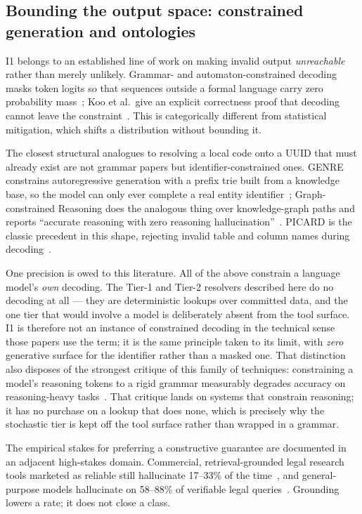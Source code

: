 \documentclass[11pt]{clapps}  %
\begin{document}
\subsection{Bounding the output space: constrained generation and ontologies}

I1 belongs to an established line of work on making invalid output
\emph{unreachable} rather than merely unlikely. Grammar- and
automaton-constrained decoding masks token logits so that sequences outside a
formal language carry zero probability
mass~\cite{willard2023outlines,geng2023gcd}; Koo et al.\ give an explicit
correctness proof that decoding cannot leave the
constraint~\cite{koo2024automata}. This is categorically different from
statistical mitigation, which shifts a distribution without bounding it.

The closest structural analogues to resolving a local code onto a UUID that must
already exist are not grammar papers but identifier-constrained ones. GENRE
constrains autoregressive generation with a prefix trie built from a knowledge
base, so the model can only ever complete a real entity
identifier~\cite{decao2021genre}; Graph-constrained Reasoning does the analogous
thing over knowledge-graph paths and reports ``accurate reasoning with zero
reasoning hallucination''~\cite{luo2024gcr}. PICARD is the classic precedent in
this shape, rejecting invalid table and column names during
decoding~\cite{scholak2021picard}.

One precision is owed to this literature. All of the above constrain a language
model's \emph{own} decoding. The Tier-1 and Tier-2 resolvers described here do
no decoding at all --- they are deterministic lookups over committed data, and
the one tier that would involve a model is deliberately absent from the tool
surface. I1 is therefore not an instance of constrained decoding in the
technical sense those papers use the term; it is the same principle taken to its
limit, with \emph{zero} generative surface for the identifier rather than a
masked one. That distinction also disposes of the strongest critique of this
family of techniques: constraining a model's reasoning tokens to a rigid grammar
measurably degrades accuracy on reasoning-heavy
tasks~\cite{tam2024letmespeak,banerjee2025crane}. That critique lands on systems
that constrain reasoning; it has no purchase on a lookup that does none, which
is precisely why the stochastic tier is kept off the tool surface rather than
wrapped in a grammar.

The empirical stakes for preferring a constructive guarantee are documented in
an adjacent high-stakes domain. Commercial, retrieval-grounded legal research
tools marketed as reliable still hallucinate 17--33\% of the
time~\cite{magesh2024hallucinationfree}, and general-purpose models hallucinate
on 58--88\% of verifiable legal queries~\cite{dahl2024legalfictions}. Grounding
lowers a rate; it does not close a class.
\end{document}

